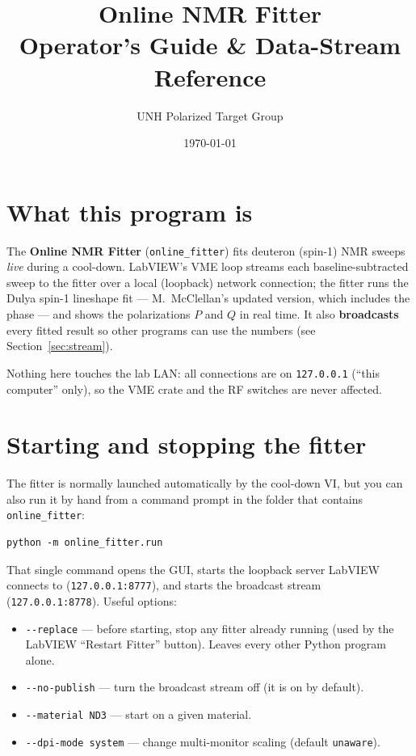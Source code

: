 \documentclass[11pt]{article}
\title{\textbf{Online NMR Fitter}\\[2pt]\large Operator's Guide \& Data-Stream Reference}
\author{UNH Polarized Target Group}
\date{\today}
\newcommand{\code}[1]{\lstinline[style=plain]|#1|}
\begin{document}
\maketitle
\tableofcontents
\bigskip

\section{What this program is}

The \textbf{Online NMR Fitter} (\code{online_fitter}) fits deuteron (spin-1) NMR sweeps
\emph{live} during a cool-down. LabVIEW's VME loop streams each baseline-subtracted sweep to
the fitter over a local (loopback) network connection; the fitter runs the Dulya spin-1
lineshape fit --- M.\ McClellan's updated version, which includes the phase --- and shows the
polarizations $P$ and $Q$ in real time. It also
\textbf{broadcasts} every fitted result so other programs can use the numbers (see
Section~\ref{sec:stream}).

Nothing here touches the lab LAN: all connections are on \code{127.0.0.1} (``this computer''
only), so the VME crate and the RF switches are never affected.

\section{Starting and stopping the fitter}

The fitter is normally launched automatically by the cool-down VI, but you can also run it by
hand from a command prompt in the folder that contains \code{online_fitter}:

\begin{lstlisting}[style=plain]
python -m online_fitter.run
\end{lstlisting}

That single command opens the GUI, starts the loopback server LabVIEW connects to
(\code{127.0.0.1:8777}), and starts the broadcast stream (\code{127.0.0.1:8778}). Useful options:

\begin{itemize}[nosep]
  \item \code{--replace} --- before starting, stop any fitter already running (used by the
        LabVIEW ``Restart Fitter'' button). Leaves every other Python program alone.
  \item \code{--no-publish} --- turn the broadcast stream off (it is on by default).
  \item \code{--material ND3} --- start on a given material.
  \item \code{--dpi-mode system} --- change multi-monitor scaling (default \code{unaware}).
\end{itemize}
\end{document}
